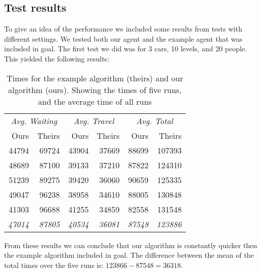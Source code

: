 \documentclass[a4paper,11pt,twocolumn]{article}
\begin{document}
\subsection{Test results}
To give an idea of the performance we included some results from tests with different settings. We tested both our agent and the example agent that was included in goal. The first test we did was for 3 cars, 10 levels, and 20 people. This yielded the following results:
\begin{table}[ht]
 \begin{tabular}{rr|rr|rr}
  \hline
  \multicolumn{2}{c|}{\emph{Avg. Waiting}} & \multicolumn{2}{c|}{\emph{Avg. Travel}} & \multicolumn{2}{c}{\emph{Avg. Total}}\\
  Ours		& Theirs	& Ours 		& Theirs & Ours & Theirs \\
  \hline
  44794 & 69724 & 43904 & 37669 & 88699 & 107393 \\
  48689 & 87100 & 39133 & 37210 & 87822	& 124310 \\
  51239 & 89275	& 39420 & 36060	& 90659 & 125335 \\
  49047 & 96238 & 38958 & 34610 & 88005 & 130848 \\
  41303 & 96688	& 41255 & 34859	& 82558 & 131548 \\
  \hline
  \emph{47014} & \emph{87805} & \emph{40534} & \emph{36081} & \emph{87548} & \emph{123886}\\  
\hline

 \end{tabular}
 \caption{Times for the example algorithm (theirs) and our algorithm (ours). Showing the times of five runs, and the average time of all runs}
 \label{tbl:3car_10lev_20pop_results}
\end{table}

From these results we can conclude that our algorithm is constantly quicker then the example algorithm included in goal. The difference between the mean of the total times over the five runs is: $123866 - 87548 = 36318$.
\end{document}
